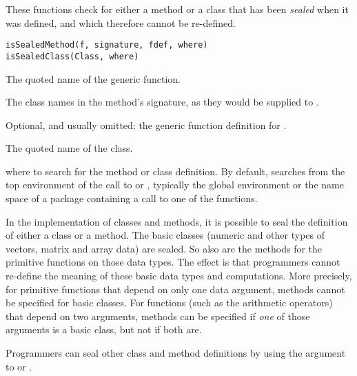 %
\begin{Description}\relax
These functions check for either a method or a class that has been
\emph{sealed} when it was defined, and which therefore cannot be
re-defined.
\end{Description}
%
\begin{Usage}
\begin{verbatim}
isSealedMethod(f, signature, fdef, where)
isSealedClass(Class, where)
\end{verbatim}
\end{Usage}
%
\begin{Arguments}
\begin{ldescription}
\item[\code{f}]  The quoted name of the generic function. 
\item[\code{signature}]  The class names in the method's signature, as
they would be supplied to . 
\item[\code{fdef}]  Optional, and usually omitted:  the generic function
definition for . 
\item[\code{Class}] The quoted name of the class.

\item[\code{where}] where to search for the method or class definition.  By
default, searches from the top environment of the call to
 or , typically the
global environment or the name space of a package containing a call
to one of the functions.
\end{ldescription}
\end{Arguments}
%
\begin{Details}\relax
In the \R{} implementation of classes and methods, it is possible to
seal the definition of either a class or a method.  The basic
classes (numeric and other types of vectors, matrix and array data)
are sealed.  So also are the methods for the primitive functions on
those data types.  The effect is that programmers cannot re-define
the meaning of these basic data types and computations.  More
precisely, for primitive functions that depend on only one data
argument, methods cannot be specified for basic classes.  For
functions (such as the arithmetic operators) that depend on two
arguments, methods can be specified if \emph{one} of those arguments
is a basic class, but not if both are.

Programmers can seal other class and method definitions by using the
 argument to  or .
\end{Details}
